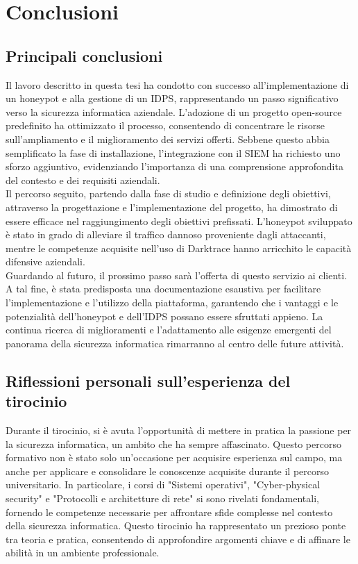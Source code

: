 \chapter{Conclusioni}
\section{Principali conclusioni}
Il lavoro descritto in questa tesi ha condotto con successo all'implementazione di un honeypot e alla gestione di un IDPS, rappresentando un passo significativo verso la sicurezza informatica aziendale. L'adozione di un progetto open-source predefinito ha ottimizzato il processo, consentendo di concentrare le risorse sull'ampliamento e il miglioramento dei servizi offerti. Sebbene questo abbia semplificato la fase di installazione, l'integrazione con il SIEM ha richiesto uno sforzo aggiuntivo, evidenziando l'importanza di una comprensione approfondita del contesto e dei requisiti aziendali.\\
Il percorso seguito, partendo dalla fase di studio e definizione degli obiettivi, attraverso la progettazione e l'implementazione del progetto, ha dimostrato di essere efficace nel raggiungimento degli obiettivi prefissati. L'honeypot sviluppato è stato in grado di alleviare il traffico dannoso proveniente dagli attaccanti, mentre le competenze acquisite nell'uso di Darktrace hanno arricchito le capacità difensive aziendali.\\
Guardando al futuro, il prossimo passo sarà l'offerta di questo servizio ai clienti. A tal fine, è stata predisposta una documentazione esaustiva per facilitare l'implementazione e l'utilizzo della piattaforma, garantendo che i vantaggi e le potenzialità dell'honeypot e dell'IDPS possano essere sfruttati appieno. La continua ricerca di miglioramenti e l'adattamento alle esigenze emergenti del panorama della sicurezza informatica rimarranno al centro delle future attività.
\section{Riflessioni personali sull'esperienza del tirocinio}
Durante il tirocinio, si è avuta l'opportunità di mettere in pratica la passione per la sicurezza informatica, un ambito che ha sempre affascinato. Questo percorso formativo non è stato solo un'occasione per acquisire esperienza sul campo, ma anche per applicare e consolidare le conoscenze acquisite durante il percorso universitario. In particolare, i corsi di "Sistemi operativi", "Cyber-physical security" e "Protocolli e architetture di rete" si sono rivelati fondamentali, fornendo le competenze necessarie per affrontare sfide complesse nel contesto della sicurezza informatica. Questo tirocinio ha rappresentato un prezioso ponte tra teoria e pratica, consentendo di approfondire argomenti chiave e di affinare le abilità in un ambiente professionale.